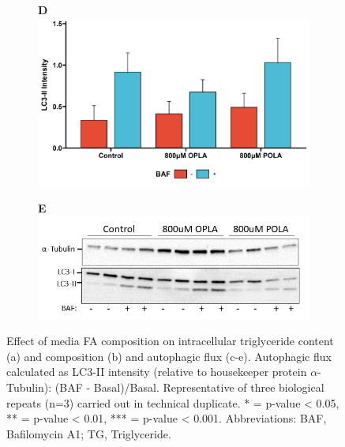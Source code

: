 \begin{figure}[h!]
\begin{subfigure}[b]{0.49\textwidth}
     \end{subfigure}
     \hfill
       \begin{subfigure}[b]{0.49\textwidth}
       \textbf{D}
         \centering
         \includegraphics[width=\textwidth]{figures/ch3-Model Development/OPLAPOLA BAF.png}
     \end{subfigure}
     \hfill
       \begin{subfigure}[b]{0.6\textwidth}
       \textbf{E}
         \centering
         \includegraphics[width=\textwidth]{figures/ch3-Model Development/OPLAPOLA WB Photo.jpg}
     \end{subfigure}
     \hfill
        \caption{Effect of media FA composition on intracellular triglyceride content (a) and composition (b) and autophagic flux (c-e). Autophagic flux calculated as LC3-II intensity (relative to housekeeper protein $\alpha$-Tubulin): (BAF - Basal)/Basal. Representative of three biological repeats (n=3) carried out in technical duplicate. * = p-value < 0.05, ** = p-value < 0.01, *** = p-value < 0.001. Abbreviations: BAF, Bafilomycin A1; TG, Triglyceride.}
        \label{fig:OPLAPOLA}
\end{figure}